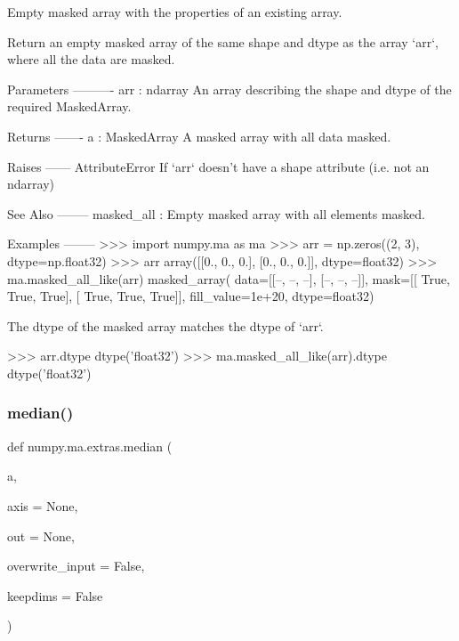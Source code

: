 \begin{DoxyVerb}Empty masked array with the properties of an existing array.

Return an empty masked array of the same shape and dtype as
the array `arr`, where all the data are masked.

Parameters
----------
arr : ndarray
    An array describing the shape and dtype of the required MaskedArray.

Returns
-------
a : MaskedArray
    A masked array with all data masked.

Raises
------
AttributeError
    If `arr` doesn't have a shape attribute (i.e. not an ndarray)

See Also
--------
masked_all : Empty masked array with all elements masked.

Examples
--------
>>> import numpy.ma as ma
>>> arr = np.zeros((2, 3), dtype=np.float32)
>>> arr
array([[0., 0., 0.],
       [0., 0., 0.]], dtype=float32)
>>> ma.masked_all_like(arr)
masked_array(
  data=[[--, --, --],
        [--, --, --]],
  mask=[[ True,  True,  True],
        [ True,  True,  True]],
  fill_value=1e+20,
  dtype=float32)

The dtype of the masked array matches the dtype of `arr`.

>>> arr.dtype
dtype('float32')
>>> ma.masked_all_like(arr).dtype
dtype('float32')\end{DoxyVerb}
 \mbox{\label{namespacenumpy_1_1ma_1_1extras_a3ef80454d56e9d5af85f4d566743f801}} 
\subsubsection{\texorpdfstring{median()}{median()}}
{\footnotesize\ttfamily def numpy.\+ma.\+extras.\+median (\begin{DoxyParamCaption}\item[{}]{a,  }\item[{}]{axis = {\ttfamily None},  }\item[{}]{out = {\ttfamily None},  }\item[{}]{overwrite\+\_\+input = {\ttfamily False},  }\item[{}]{keepdims = {\ttfamily False} }\end{DoxyParamCaption})}

